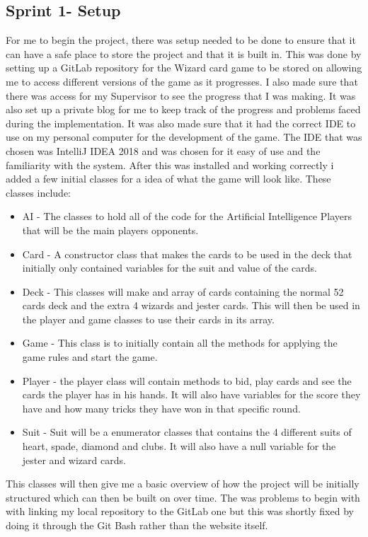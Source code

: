 \subsection{Sprint 1- Setup}
For me to begin the project, there was setup needed to be done to ensure that it can have a safe place to store the project and that it is built in. This was done by setting up a GitLab repository for the Wizard card game to be stored on allowing me to access different versions of the game as it progresses. I also made sure that there was access for my Supervisor to see the progress that I was making. It was also set up a private blog for me to keep track of the progress and problems faced during the implementation. It was also made sure that it had the correct IDE to use on my personal computer for the development of the game. The IDE that was chosen was IntelliJ IDEA 2018 and was chosen for it easy of use and the familiarity with the system. After this was installed and working correctly i added a few initial classes for a idea of what the game will look like. These classes include:
\begin{itemize}
\item AI - The classes to hold all of the code for the Artificial Intelligence Players that will be the main players opponents.
\item Card - A constructor class that makes the cards to be used in the deck that initially only contained variables for the suit and value of the cards.
\item Deck - This classes will make and array of cards containing the normal 52 cards deck and the extra 4 wizards and jester cards. This will then be used in the player and game classes to use their cards in its array.
\item Game - This class is to initially contain all the methods for applying the game rules and start the game.
\item Player - the player class will contain methods to bid, play cards and see the cards the player has in his hands. It will also have variables for the score they have and how many tricks they have won in that specific round.
\item Suit - Suit will be a enumerator classes that contains the 4 different suits of heart, spade, diamond and clubs. It will also have a null variable for the jester and wizard cards.
\end{itemize}

This classes will then give me a basic overview of how the project will be initially structured which can then be built on over time. The was problems to begin with with linking my local repository to the GitLab one but this was shortly fixed by doing it through the Git Bash rather than the website itself.
